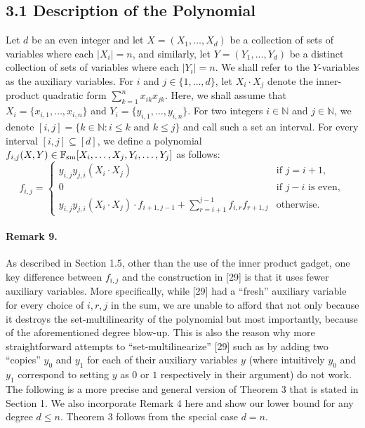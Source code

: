 \documentclass[10pt,a4paper]{article}
\begin{document}
\subsection*{3.1 Description of the Polynomial}
Let $d$ be an even integer and let $X=(X_1,\ldots,X_d)$ be a collection of sets of variables where each $|X_i|=n$, and similarly, let $Y=(Y_1,\ldots,Y_d)$ be a distinct collection of sets of variables where each $|Y_i|=n$. We shall refer to the $Y$-variables as the auxiliary variables. For $i$ and $j\in\{1,\ldots,d\}$, let $X_i\cdot X_j$ denote the inner-product quadratic form $\sum_{k=1}^n x_{ik}x_{jk}$. Here, we shall assume that $X_i=\{x_{i,1},\ldots,x_{i,n}\}$ and $Y_i=\{y_{i,1},\ldots,y_{i,n}\}$.
For two integers $i\in\mathbb N$ and $j\in\mathbb N$, we denote $[i,j]=\{k\in\mathbb N:i\leq k\text{ and }k\leq j\}$ and call such a set an interval. For every interval $[i,j]\subseteq[d]$, we define a polynomial $f_{i,j}(X,Y)\in\mathbb F_{\rm sm}[X_i,\ldots,X_j,Y_i,\ldots,Y_j]$ as follows:
\[f_{i,j}=\begin{cases}
y_{i,j}y_{j,i}(X_i\cdot X_j)&\text{if }j=i+1,\\
0&\text{if }j-i\text{ is even},\\
y_{i,j}y_{j,i}(X_i\cdot X_j)\cdot f_{i+1,j-1}+\displaystyle\sum_{r=i+1}^{j-1} f_{i,r}f_{r+1,j}&\text{otherwise}.
\end{cases}\]
\paragraph{Remark 9.} As described in Section 1.5, other than the use of the inner product gadget, one key difference between $f_{i,j}$ and the construction in [29] is that it uses fewer auxiliary variables. More specifically, while [29] had a ``fresh'' auxiliary variable for every choice of $i,r,j$ in the sum, we are unable to afford that not only because it destroys the set-multilinearity of the polynomial but most importantly, because of the aforementioned degree blow-up. This is also the reason why more straightforward attempts to ``set-multilinearize'' [29] such as by adding two ``copies'' $y_0$ and $y_1$ for each of their auxiliary variables $y$ (where intuitively $y_0$ and $y_1$ correspond to setting $y$ as $0$ or $1$ respectively in their argument) do not work.
The following is a more precise and general version of Theorem 3 that is stated in Section 1. We also incorporate Remark 4 here and show our lower bound for any degree $d\leq n$. Theorem 3 follows from the special case $d=n$.
\end{document}
